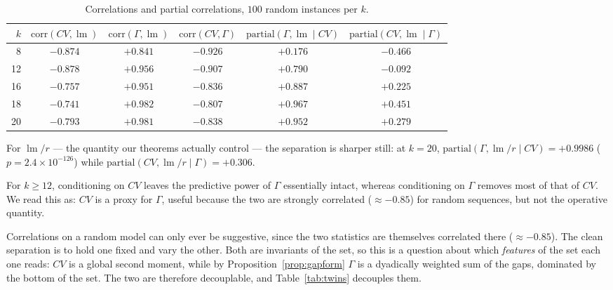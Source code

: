 \documentclass[11pt,a4paper]{article}
\theoremstyle{plain}
\theoremstyle{definition}
\theoremstyle{remark}
\DeclareMathOperator{\lm}{lm}
\begin{document}
\begin{table}[htbp]
\centering
\small
\begin{tabular}{rccccc}
\toprule
$k$ & $\mathrm{corr}(CV,\lm)$ & $\mathrm{corr}(\Gamma,\lm)$ &
$\mathrm{corr}(CV,\Gamma)$ &
$\mathrm{partial}(\Gamma,\lm\mid CV)$ &
$\mathrm{partial}(CV,\lm\mid\Gamma)$\\
\midrule
8 & $-0.874$ & $+0.841$ & $-0.926$ & $+0.176$ & $-0.466$\\
12 & $-0.878$ & $+0.956$ & $-0.907$ & $+0.790$ & $-0.092$\\
16 & $-0.757$ & $+0.951$ & $-0.836$ & $+0.887$ & $+0.225$\\
18 & $-0.741$ & $+0.982$ & $-0.807$ & $+0.967$ & $+0.451$\\
20 & $-0.793$ & $+0.981$ & $-0.838$ & $+0.952$ & $+0.279$\\
\bottomrule
\end{tabular}
\caption{Correlations and partial correlations, $100$ random instances per $k$.}
\label{tab:cv}
\end{table}

For $\lm/r$ --- the quantity our theorems actually control --- the separation
is sharper still: at $k=20$,
$\mathrm{partial}(\Gamma,\lm/r\mid CV)=+0.9986$
($p=2.4\times10^{-126}$) while
$\mathrm{partial}(CV,\lm/r\mid\Gamma)=+0.306$.

For $k\ge12$, conditioning on $CV$ leaves the predictive power of $\Gamma$
essentially intact, whereas conditioning on $\Gamma$ removes most of that of
$CV$. We read this as: $CV$ is a proxy for $\Gamma$, useful because the two are
strongly correlated ($\approx-0.85$) for random sequences, but not the operative
quantity.

Correlations on a random model can only ever be suggestive, since the two
statistics are themselves correlated there ($\approx-0.85$). The clean
separation is to hold one fixed and vary the other. Both are invariants of the
set, so this is a question about which \emph{features} of the set each one
reads: $CV$ is a global second moment, while by Proposition~\ref{prop:gapform}
$\Gamma$ is a dyadically weighted sum of the gaps, dominated by the bottom of
the set. The two are therefore decouplable, and Table~\ref{tab:twins} decouples
them.
\end{document}

